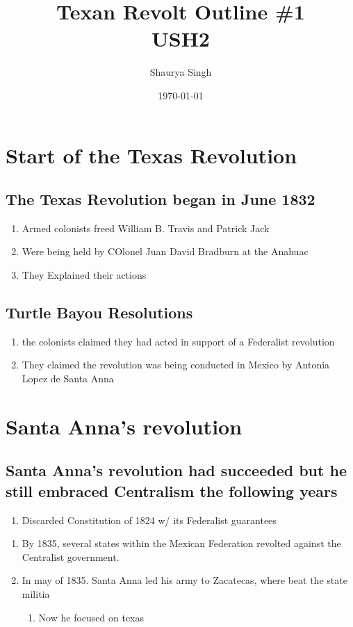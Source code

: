 \documentclass{scrartcl}
\author{Shaurya Singh}
\date{\today}
\title{Texan Revolt Outline \#1\\\medskip
\large USH2}
\begin{document}
\maketitle
\setcounter{tocdepth}{2}
\tableofcontents


\section{Start of the Texas Revolution}
\label{sec:org61327c8}
\subsection{The Texas Revolution began in June 1832}
\label{sec:org8ab406e}
\begin{enumerate}
\item Armed colonists freed William B. Travis and Patrick Jack
\item Were being held by COlonel Juan David Bradburn at the Anahuac
\item They Explained their actions
\end{enumerate}
\subsection{Turtle Bayou Resolutions}
\label{sec:org4a4109a}
\begin{enumerate}
\item the colonists claimed they had acted in support of a Federalist revolution
\item They claimed the revolution was being conducted in Mexico by Antonia Lopez de Santa Anna
\end{enumerate}
\section{Santa Anna’s revolution}
\label{sec:org855acfd}
\subsection{Santa Anna’s revolution had succeeded but he still embraced Centralism the following years}
\label{sec:org6683ae9}
\begin{enumerate}
\item Discarded Constitution of 1824 w/ its Federalist guarantees
\end{enumerate}
\begin{enumerate}
\item By 1835, several states within the Mexican Federation revolted against
the Centralist government.
\item In may of 1835. Santa Anna led his army to Zacatecas, where beat the state militia
\begin{enumerate}
\item Now he focused on texas
\end{enumerate}
\end{enumerate}
\end{document}
